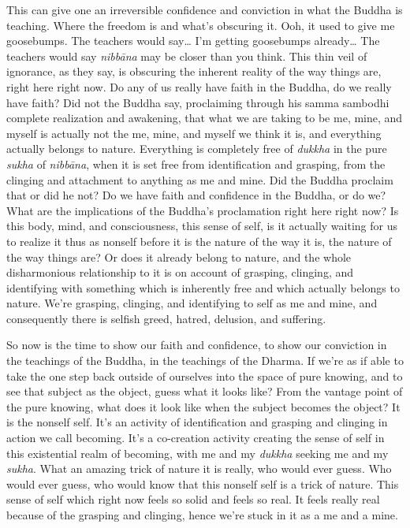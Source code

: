 \documentclass[12pt,openany]{book}
\begin{document}
This can give one an irreversible confidence and conviction in what the Buddha is teaching. Where the freedom is and what's obscuring it. Ooh, it used to give me goosebumps. The teachers would say… I’m getting goosebumps already… The teachers would say \textit{nibbāna} may be closer than you think. This thin veil of ignorance, as they say, is obscuring the inherent reality of the way things are, right here right now. Do any of us really have faith in the Buddha, do we really have faith? Did not the Buddha say, proclaiming through his samma sambodhi complete realization and awakening, that what we are taking to be me, mine, and myself is actually not the me, mine, and myself we think it is, and everything actually belongs to nature. Everything is completely free of \textit{dukkha} in the pure \textit{sukha} of \textit{nibbāna}, when it is set free from identification and grasping, from the clinging and attachment to anything as me and mine. Did the Buddha proclaim that or did he not? Do we have faith and confidence in the Buddha, or do we? What are the implications of the Buddha’s proclamation right here right now? Is this body, mind, and consciousness, this sense of self, is it actually waiting for us to realize it thus as nonself before it is the nature of the way it is, the nature of the way things are? Or does it already belong to nature, and the whole disharmonious relationship to it is on account of grasping, clinging, and identifying with something which is inherently free and which actually belongs to nature. We’re grasping, clinging, and identifying to self as me and mine, and consequently there is selfish greed, hatred, delusion, and suffering. 

So now is the time to show our faith and confidence, to show our conviction in the teachings of the Buddha, in the teachings of the Dhar\-ma. If we’re as if able to take the one step back outside of ourselves into the space of pure knowing, and to see that subject as the object, guess what it looks like? From the vantage point of the pure knowing, what does it look like when the subject becomes the object? It is the nonself self. It's an activity of identification and grasping and clinging in action we call becoming. It's a co-creation activity creating the sense of self in this existential realm of becoming, with me and my \textit{dukkha} seeking me and my \textit{sukha}. What an amazing trick of nature it is really, who would ever guess. Who would ever guess, who would know that this nonself self is a trick of nature. This sense of self which right now feels so solid and feels so real. It feels really real because of the grasping and clinging, hence we're stuck in it as a me and a mine.
\end{document}
